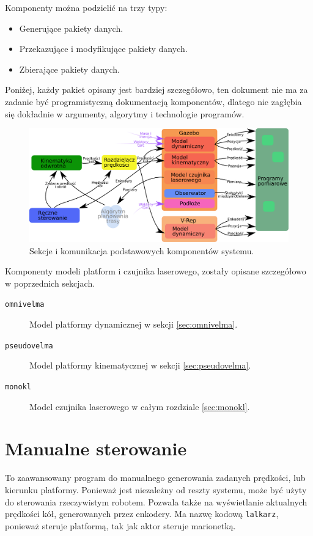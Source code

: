 Komponenty można podzielić na trzy typy:
\begin{itemize}
	\item Generujące pakiety danych.
	\item Przekazujące i modyfikujące pakiety danych.
	\item Zbierające pakiety danych.
\end{itemize}
Poniżej, każdy pakiet opisany jest bardziej szczegółowo, ten dokument nie ma za zadanie być programistyczną dokumentacją komponentów, dlatego 
nie zagłębia się dokładnie w argumenty, algorytmy i technologie programów.

\begin{figure}[H]
	\centering
	\includegraphics[width=\textwidth]{graphics/comm.pdf}
	\caption{Sekcje i komunikacja podstawowych komponentów systemu.}
\end{figure} 

Komponenty modeli platform i czujnika laserowego, zostały opisane szczegółowo w poprzednich sekcjach.

\begin{description}
	\item[\texttt{omnivelma}] Model platformy dynamicznej w sekcji \ref{sec:omnivelma}.
	\item[\texttt{pseudovelma}] Model platformy kinematycznej w sekcji \ref{sec:pseudovelma}.
	\item[\texttt{monokl}] Model czujnika laserowego w całym rozdziale \ref{sec:monokl}.
\end{description}

\section{Manualne sterowanie}
\label{sec:lalkarz}
	To zaawansowany program do manualnego generowania zadanych prędkości, lub kierunku platformy.
	Ponieważ jest niezależny od reszty systemu, może być użyty do sterowania rzeczywistym robotem.
	Pozwala także na wyświetlanie aktualnych prędkości kół, generowanych przez enkodery.
	Ma nazwę kodową \texttt{lalkarz}, ponieważ steruje platformą, tak jak aktor steruje marionetką.
	
